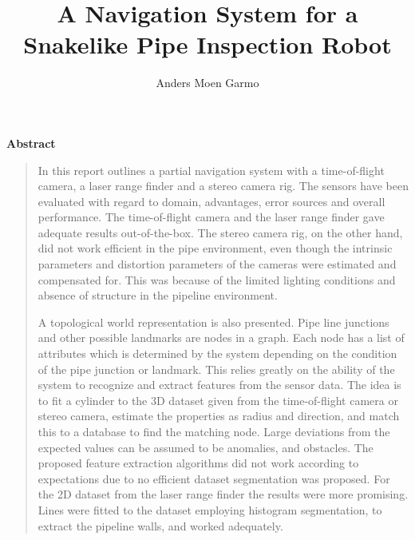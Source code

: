 \documentclass[twoside, a4paper, 12pt]{book}
\title{A Navigation System for a Snakelike Pipe Inspection Robot}
\author{Anders Moen Garmo}
\numberwithin{algorithm}{chapter}
\newenvironment{abstracts} { \pagestyle{empty}
  \begin{center}
  \vspace*{1.5cm}
  {\Large \bfseries  Abstract}
  \end{center}
  \vspace{0.5cm}
   \begin{quote}}
{\end{quote}}
\begin{document}

\maketitle  %




\cleardoublepage



\begin{abstracts}
In this report outlines a partial navigation system with a time-of-flight camera, a laser range
finder and a stereo camera rig. The sensors have been evaluated with
regard to domain, advantages, error sources and overall performance. The time-of-flight camera and the
laser range finder gave adequate results out-of-the-box. The stereo camera rig, on the
other hand, did not work efficient in the pipe environment, even though the intrinsic parameters and distortion
parameters of the cameras were estimated and compensated for. This was because of the limited lighting
conditions and absence of structure in the pipeline environment. 

A topological world representation is also presented. Pipe line junctions and other
possible landmarks are nodes in a graph. Each node has a list of attributes which is
determined by the system depending on the condition of the pipe junction or landmark. This
relies greatly on the ability of the system to recognize and extract features from the
sensor data. The idea is to fit a cylinder to the 3D dataset given from the time-of-flight
camera or stereo camera, estimate the properties as radius and direction, and match this
to a database to find the matching node. Large deviations from the expected values can be
assumed to be anomalies, and obstacles. 
The proposed feature extraction algorithms did not work according to expectations due to 
no efficient dataset segmentation was proposed. For
the 2D dataset from the laser range finder the results were more promising. Lines were
fitted to the dataset employing histogram segmentation, to extract the pipeline walls, and
worked adequately. 
\end{abstracts}

\frontmatter
\end{document}
